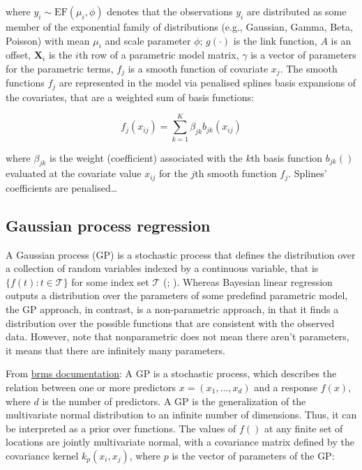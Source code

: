 \documentclass[
  doc,
  floatsintext,
  longtable,
  a4paper,
  nolmodern,
  notxfonts,
  notimes,
  colorlinks=true,linkcolor=blue,citecolor=blue,urlcolor=blue]{apa7}
\begin{document}
where \(y_{i} \sim \mathrm{EF}\left(\mu_{i}, \phi\right)\) denotes that
the observations \(y_{i}\) are distributed as some member of the
exponential family of distributions (e.g., Gaussian, Gamma, Beta,
Poisson) with mean \(\mu_{i}\) and scale parameter \(\phi\);
\(g(\cdot)\) is the link function, \(A\) is an offset,
\(\mathbf{X}_{i}\) is the \(i\)th row of a parametric model matrix,
\(\gamma\) is a vector of parameters for the parametric terms, \(f_{j}\)
is a smooth function of covariate \(x_{j}\). The smooth functions
\(f_{j}\) are represented in the model via penalised splines basis
expansions of the covariates, that are a weighted sum of basis
functions:

\[
f_{j}\left(x_{i j}\right) = \sum_{k=1}^K \beta_{jk} b_{jk}\left(x_{ij}\right)
\]

where \(\beta_{jk}\) is the weight (coefficient) associated with the
\(k\)th basis function \(b_{jk}()\) evaluated at the covariate value
\(x_{ij}\) for the \(j\)th smooth function \(f_{j}\). Splines'
coefficients are penalised\ldots{}

\subsection{Gaussian process
regression}\label{gaussian-process-regression}

A Gaussian process (GP) is a stochastic process that defines the
distribution over a collection of random variables indexed by a
continuous variable, that is \(\{f(t): t \in \mathcal{T}\}\) for some
index set \(\mathcal{T}\) (;
). Whereas Bayesian linear regression outputs a distribution over
the parameters of some predefind parametric model, the GP approach, in
contrast, is a non-parametric approach, in that it finds a distribution
over the possible functions that are consistent with the observed data.
However, note that nonparametric does not mean there aren't parameters,
it means that there are infinitely many parameters.

From
\href{https://www.rdocumentation.org/packages/brms/versions/2.22.0/topics/gp}{brms
documentation}: A GP is a stochastic process, which describes the
relation between one or more predictors
\(x=\left(x_{1}, \ldots, x_{d}\right)\) and a response \(f(x)\), where
\(d\) is the number of predictors. A GP is the generalization of the
multivariate normal distribution to an infinite number of dimensions.
Thus, it can be interpreted as a prior over functions. The values of
\(f()\) at any finite set of locations are jointly multivariate normal,
with a covariance matrix defined by the covariance kernel
\(k_p\left(x_i, x_j\right)\), where \(p\) is the vector of parameters of
the GP:
\end{document}
